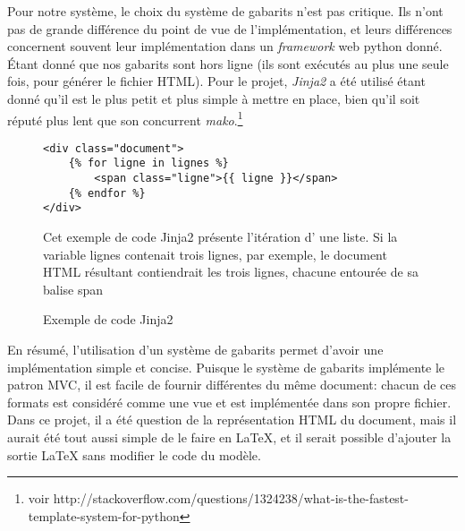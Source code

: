 Pour notre système, le choix du système de gabarits n'est pas critique. Ils n'ont pas de grande différence du point de vue de l'implémentation, et leurs différences concernent souvent leur implémentation dans un \emph{framework} web python donné. Étant donné que nos gabarits sont hors ligne (ils sont exécutés au plus une seule fois, pour générer le fichier HTML). Pour le projet, \emph{Jinja2} a été utilisé étant donné qu'il est le plus petit et plus simple à mettre en place, bien qu'il soit réputé plus lent que son concurrent \emph{mako}.\footnote{voir http://stackoverflow.com/questions/1324238/what-is-the-fastest-template-system-for-python}
\begin{figure*}
\begin{lstlisting}
<div class="document">
    {% for ligne in lignes %}
        <span class="ligne">{{ ligne }}</span>
    {% endfor %}
</div>

\end{lstlisting}
\caption{Exemple de code Jinja2}{Cet exemple de code Jinja2 présente l'itération d' une liste. Si la variable lignes contenait trois lignes, par exemple, le document HTML résultant contiendrait les trois lignes, chacune entourée de sa balise span}
\end{figure*}
En résumé, l'utilisation d'un système de gabarits permet d'avoir une implémentation simple et concise. Puisque le système de gabarits implémente le patron MVC, il est facile de fournir différentes du même document: chacun de ces formats est considéré comme une vue et est implémentée dans son propre fichier. Dans ce projet, il a été question de la représentation HTML du document, mais il aurait été tout aussi simple de le faire en LaTeX, et il serait possible d'ajouter la sortie LaTeX sans modifier le code du modèle.
